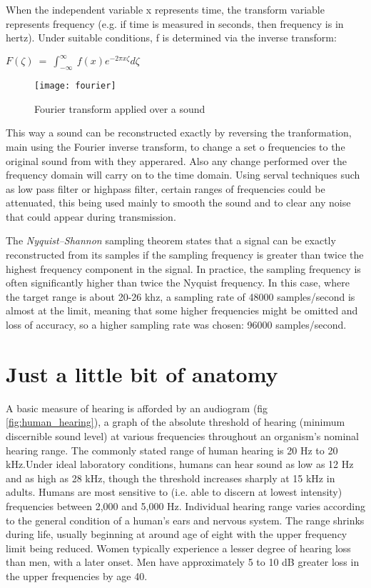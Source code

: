 \documentclass[12pt]{report}
\begin{document}
When the independent variable x represents time, the transform variable  represents frequency (e.g. if time is measured in seconds, then frequency is in hertz). Under suitable conditions, f is determined via the inverse transform: 
\begin{center}
\begin{math}
F\left(\zeta \right)\:=\:\int _{-\infty }^{\infty }\:f\left(x\right)e^{-2\pi x\zeta } d\zeta
\end{math}
\end{center}
\begin{figure}[!h]
\centering
\texttt{[image: fourier]}
\caption{Fourier transform applied over a sound}
\label{fig:fourier}
\end{figure}
This way a sound can be reconstructed exactly by reversing the tranformation, main using the Fourier inverse transform, to change a set o frequencies to the original sound from with they apperared. Also any change performed over the frequency domain will carry on to the time domain. Using serval techniques such as low pass filter or highpass filter, certain ranges of frequencies could be attenuated, this being used mainly to smooth the sound and to clear any noise that could appear during transmission.





The \emph{Nyquist–Shannon} sampling theorem states that a signal can be exactly reconstructed from its samples if the sampling frequency is greater than twice the highest frequency component in the signal. In practice, the sampling frequency is often significantly higher than twice the Nyquist frequency\cite{note5}. In this case, where the target range is about 20-26 khz, a sampling  rate of 48000 samples/second is almost at the limit, meaning that some higher frequencies might be omitted and loss of accuracy, so a higher sampling rate was chosen: 96000 samples/second.


\section{Just a little bit of anatomy}
A basic measure of hearing is afforded by an audiogram (fig \ref{fig:human_hearing}), a graph of the absolute threshold of hearing (minimum discernible sound level) at various frequencies throughout an organism's nominal hearing range. The commonly stated range of human hearing is 20 Hz to 20 kHz.Under ideal laboratory conditions, humans can hear sound as low as 12 Hz and as high as 28 kHz, though the threshold increases sharply at 15 kHz in adults. Humans are most sensitive to (i.e. able to discern at lowest intensity) frequencies between 2,000 and 5,000 Hz. Individual hearing range varies according to the general condition of a human's ears and nervous system. The range shrinks during life, usually beginning at around age of eight with the upper frequency limit being reduced. Women typically experience a lesser degree of hearing loss than men, with a later onset. Men have approximately 5 to 10 dB greater loss in the upper frequencies by age 40\cite{note6}.
\end{document}

